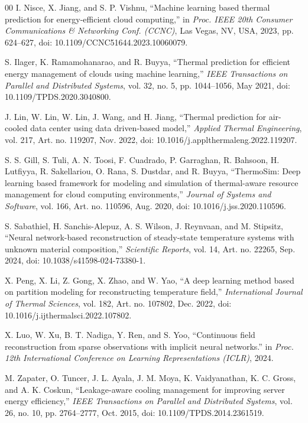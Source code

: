 \documentclass[12pt,a4paper]{article}
\begin{document}
\begin{thebibliography}{00}
I. Nisce, X. Jiang, and S. P. Vishnu, ``Machine learning based thermal prediction for energy-efficient cloud computing,'' in \textit{Proc. IEEE 20th Consumer Communications \& Networking Conf. (CCNC)}, Las Vegas, NV, USA, 2023, pp. 624--627, doi: 10.1109/CCNC51644.2023.10060079.

S. Ilager, K. Ramamohanarao, and R. Buyya, ``Thermal prediction for efficient energy management of clouds using machine learning,'' \textit{IEEE Transactions on Parallel and Distributed Systems}, vol. 32, no. 5, pp. 1044--1056, May 2021, doi: 10.1109/TPDS.2020.3040800.

J. Lin, W. Lin, W. Lin, J. Wang, and H. Jiang, ``Thermal prediction for air-cooled data center using data driven-based model,'' \textit{Applied Thermal Engineering}, vol. 217, Art. no. 119207, Nov. 2022, doi: 10.1016/j.applthermaleng.2022.119207.

S. S. Gill, S. Tuli, A. N. Toosi, F. Cuadrado, P. Garraghan, R. Bahsoon, H. Lutfiyya, R. Sakellariou, O. Rana, S. Dustdar, and R. Buyya, ``ThermoSim: Deep learning based framework for modeling and simulation of thermal-aware resource management for cloud computing environments,'' \textit{Journal of Systems and Software}, vol. 166, Art. no. 110596, Aug. 2020, doi: 10.1016/j.jss.2020.110596.

S. Sabathiel, H. Sanchis-Alepuz, A. S. Wilson, J. Reynvaan, and M. Stipsitz, ``Neural network-based reconstruction of steady-state temperature systems with unknown material composition,'' \textit{Scientific Reports}, vol. 14, Art. no. 22265, Sep. 2024, doi: 10.1038/s41598-024-73380-1.

X. Peng, X. Li, Z. Gong, X. Zhao, and W. Yao, ``A deep learning method based on partition modeling for reconstructing temperature field,'' \textit{International Journal of Thermal Sciences}, vol. 182, Art. no. 107802, Dec. 2022, doi: 10.1016/j.ijthermalsci.2022.107802.

X. Luo, W. Xu, B. T. Nadiga, Y. Ren, and S. Yoo, ``Continuous field reconstruction from sparse observations with implicit neural networks.'' in \textit{Proc. 12th International Conference on Learning Representations (ICLR)}, 2024.

M. Zapater, O. Tuncer, J. L. Ayala, J. M. Moya, K. Vaidyanathan, K. C. Gross, and A. K. Coskun, ``Leakage-aware cooling management for improving server energy efficiency,'' \textit{IEEE Transactions on Parallel and Distributed Systems}, vol. 26, no. 10, pp. 2764--2777, Oct. 2015, doi: 10.1109/TPDS.2014.2361519.


\end{thebibliography}
\end{document}
